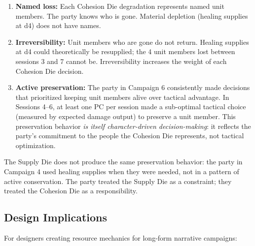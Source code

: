 \begin{enumerate}
  \item \textbf{Named loss:} Each Cohesion Die degradation represents named unit members.
    The party knows who is gone. Material depletion (healing supplies at d4) does not
    have names.

  \item \textbf{Irreversibility:} Unit members who are gone do not return. Healing supplies
    at d4 could theoretically be resupplied; the 4 unit members lost between sessions 3
    and 7 cannot be. Irreversibility increases the weight of each Cohesion Die decision.

  \item \textbf{Active preservation:} The party in Campaign 6 consistently made decisions
    that prioritized keeping unit members alive over tactical advantage. In Sessions 4--6,
    at least one PC per session made a sub-optimal tactical choice (measured by expected
    damage output) to preserve a unit member. This preservation behavior \textit{is itself
    character-driven decision-making}: it reflects the party's commitment to the people
    the Cohesion Die represents, not tactical optimization.
\end{enumerate}

The Supply Die does not produce the same preservation behavior: the party in Campaign 4
used healing supplies when they were needed, not in a pattern of active conservation.
The party treated the Supply Die as a constraint; they treated the Cohesion Die as
a responsibility.

\subsection{Design Implications}

For designers creating resource mechanics for long-form narrative campaigns:

